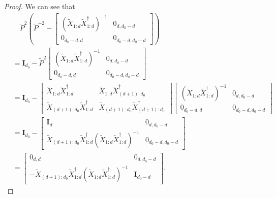 \documentclass{article}
\theoremstyle{plain}
\theoremstyle{definition}
\theoremstyle{remark}
\theoremstyle{remark}
\begin{document}
\begin{proof}
    We can see that 
    \begin{align}
      & \quad \widetilde{P}^2 \left(\widetilde{P}^{-2} - \begin{bmatrix}\left(\widetilde{X}_{1:d} \widetilde{X}_{1:d}^{\dagger}\right)^{-1} & 0_{d, d_0-d} \\ 0_{d_0-d, d} & 0_{d_0-d, d_0-d} \end{bmatrix} \right) \\
      &= \mathbf{I}_{d_0}-\widetilde{P}^2 \begin{bmatrix}\left(\widetilde{X}_{1:d} \widetilde{X}_{1:d}^{\dagger}\right)^{-1} & 0_{d, d_0-d} \\ 0_{d_0-d, d} & 0_{d_0-d, d_0-d} \end{bmatrix} \nonumber \\ 
      &= \mathbf{I}_{d_0} - \begin{bmatrix} \widetilde{X}_{1:d} \widetilde{X}_{1:d}^{\dagger} & \widetilde{X}_{1:d} \widetilde{X}_{(d+1):d_0}^{\dagger} \\ \widetilde{X}_{(d+1):d_0} \widetilde{X}_{1:d}^{\dagger} & \widetilde{X}_{(d+1):d_0} \widetilde{X}_{(d+1):d_0}^{\dagger} \end{bmatrix} \begin{bmatrix}\left(\widetilde{X}_{1:d} \widetilde{X}_{1:d}^{\dagger}\right)^{-1} & 0_{d, d_0-d} \\ 0_{d_0-d, d} & 0_{d_0-d, d_0-d} \end{bmatrix} \nonumber \\
      &= \mathbf{I}_{d_0} - \begin{bmatrix} \mathbf{I}_d & 0_{d, d_0-d} \\ \widetilde{X}_{(d+1):d_0} \widetilde{X}_{1:d}^{\dagger}\left(\widetilde{X}_{1:d} \widetilde{X}_{1:d}^{\dagger}\right)^{-1} & 0_{d_0-d, d_0-d} \end{bmatrix} \nonumber \\
      &= \begin{bmatrix} 0_{d, d} & 0_{d, d_0-d} \\ -\widetilde{X}_{(d+1):d_0} \widetilde{X}_{1:d}^{\dagger}\left(\widetilde{X}_{1:d} \widetilde{X}_{1:d}^{\dagger}\right)^{-1} & \mathbf{I}_{d_0-d} \end{bmatrix}.
    \end{align}


\end{proof}
\end{document}

